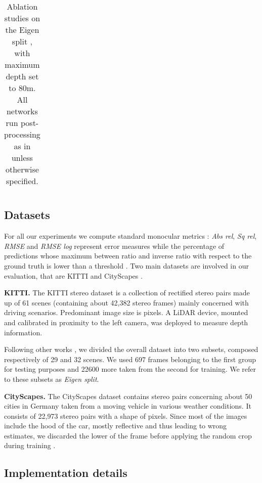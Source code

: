 \documentclass[10pt,twocolumn,letterpaper]{article}
\begin{document}
\begin{table*}[!h]
{\begin{tabular}{lccc|cccc|ccc}
\hline

\end{tabular}
}
\smallskip
\caption{Ablation studies on the Eigen split \cite{eigen2014depth}, with maximum depth set to 80m. All networks run post-processing as in \cite{monodepth17} unless otherwise specified.}
\label{tab:comparison_monodepth}
\end{table*}



 
\subsection{Datasets}

For all our experiments we compute standard monocular metrics \cite{eigen2014depth,monodepth17}: \textit{Abs rel}, \textit{Sq rel}, \textit{RMSE} and \textit{RMSE log} represent error measures while  the percentage of predictions whose maximum between ratio and inverse ratio with respect to the ground truth is lower than a threshold . Two main datasets are involved in our evaluation, that are KITTI \cite{KITTI_RAW} and CityScapes \cite{cordts2016cityscapes}.

\textbf{KITTI.}
The KITTI stereo dataset \cite{KITTI_RAW} is a collection of rectified stereo pairs made up of 61 scenes (containing about 42,382 stereo frames) mainly concerned with driving scenarios. Predominant image size is  pixels. A LiDAR device, mounted and calibrated in proximity to the left camera, was deployed to measure depth information.

Following other works \cite{eigen2014depth, monodepth17}, we divided the overall dataset into two subsets, composed respectively of 29 and 32 scenes. We used 697 frames belonging to the first group for testing purposes and 22600 more taken from the second for training. We refer to these subsets as \textit{Eigen split}.

\textbf{CityScapes.}
The CityScapes dataset \cite{cordts2016cityscapes} contains stereo pairs concerning about 50 cities in Germany taken from a moving vehicle in various weather conditions. It consists of 22,973 stereo pairs with a shape of  pixels. Since most of the images include the hood of the car, mostly reflective and thus leading to wrong estimates, we discarded the lower  of the frame before applying the random crop during training \cite{monodepth17}.   



\subsection{Implementation details}
\end{document}

